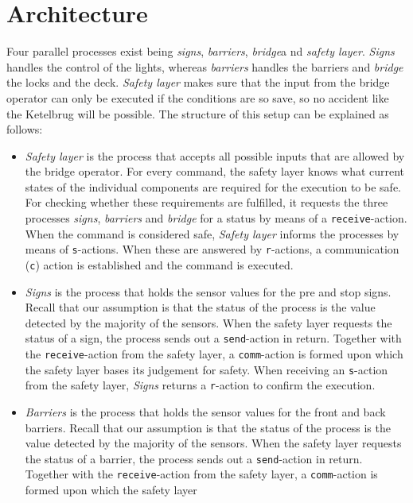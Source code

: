 \section{Architecture}
\label{sec:arch}

Four parallel processes exist being \emph{signs}, \emph{barriers},  \emph{bridge}a nd \emph{safety layer}. \emph{Signs} handles the control of the lights, whereas \emph{barriers} handles the barriers and \emph{bridge} the locks and the deck. \emph{Safety layer} makes sure that the input from the bridge operator can only be executed if the conditions are so save, so no accident like the Ketelbrug will be possible. The structure of this setup can be explained as follows:
%
\begin{itemize}
	\item \emph{Safety layer} is the process that accepts all possible inputs that are allowed by the bridge operator. For every command, the safety layer knows what current states of the individual components are required for the 
	execution to be safe. For checking whether these requirements are fulfilled, it requests the three processes \emph{signs}, \emph{barriers} and \emph{bridge} for a status by means of a \texttt{receive}-action. 
	When the command is considered safe, \emph{Safety layer} informs the processes by means of \texttt{s}-actions. When these are answered by \texttt{r}-actions, a communication (\texttt{c}) action is established and the command 
	is executed.
	\item \emph{Signs} is the process that holds the sensor values for the pre and stop signs. Recall that our assumption is that the status of the process is the value detected by the majority of the sensors. When the safety layer 
	requests the status of a sign, the process sends out a \texttt{send}-action in return. Together with the \texttt{receive}-action from the safety layer, a \texttt{comm}-action is formed upon which the safety layer bases its 
	judgement for safety. When receiving an \texttt{s}-action from the safety layer, \emph{Signs} returns a \texttt{r}-action to confirm the execution.
	\item \emph{Barriers} is the process that holds the sensor values for the front and back barriers. Recall that our assumption is that the status of the process is the value detected by the majority of the sensors. When the 
	safety layer requests the status of a barrier, the process sends out a \texttt{send}-action in return. Together with the \texttt{receive}-action from the safety layer, a \texttt{comm}-action is formed upon which the safety layer 

\end{itemize}
